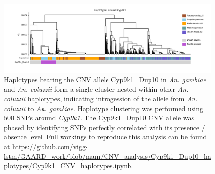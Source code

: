 \documentclass[a4paper,12pt]{article}
\begin{document}
\clearpage

\begin{figure}[h]
	\includegraphics*[width = 17cm]{../../CNV_analysis/Cyp9k1_Dup10_haplotypes/Cyp9k1_haplotype_clustering.png}
	\caption{\footnotesize Haplotypes bearing the CNV allele Cyp9k1\_Dup10 in \textit{An. gambiae} and \textit{An. coluzzii} form a single cluster nested within other \textit{An. coluzzii} haplotypes, indicating introgession of the allele from \textit{An. coluzzii} to \textit{An. gambiae}. Haplotype clustering was performed using 500 SNPs around \textit{Cyp9k1}. The Cyp9k1\_Dup10 CNV allele was phased by identifying SNPs perfectly correlated with its presence / absence level. Full workings to reproduce this analysis can be found at \url{https://github.com/vigg-lstm/GAARD\_work/blob/main/CNV\_analysis/Cyp9k1\_Dup10\_haplotypes/Cyp9k1\_CNV\_haplotypes.ipynb}.}
	\label{FigS3}
\end{figure}
\end{document}
